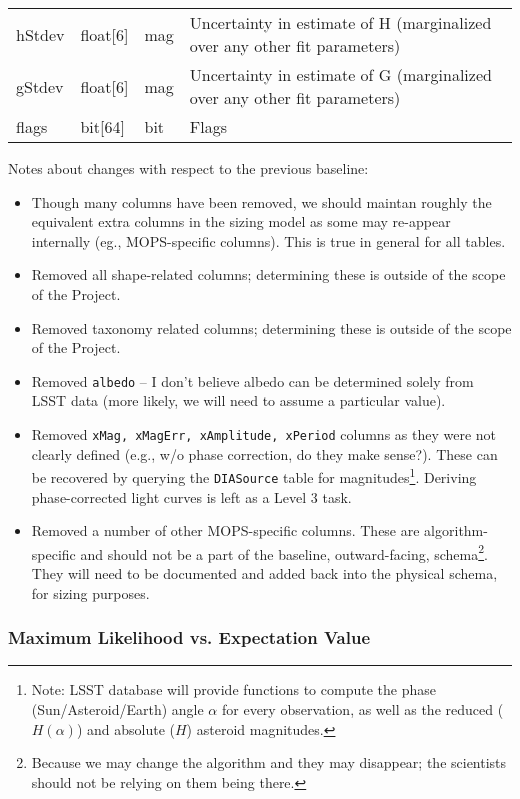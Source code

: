\documentclass[12pt]{article}
\newcommand{\code}[1]{\texttt{#1}}
\newcommand{\DIASource}{\code{DIASource}\xspace}
\begin{document}
\begin{center}
\begin{longtable}{p{3cm}p{2cm}p{2cm}p{5cm}}
hStdev & float[6] & mag & Uncertainty in estimate of H (marginalized over any other fit parameters)\\

gStdev & float[6] & mag & Uncertainty in estimate of G (marginalized over any other fit parameters)\\

flags & bit[64] & bit & Flags \\ \hline

\end{longtable}
\end{center}

Notes about changes with respect to the previous baseline:
\begin{itemize}
\item Though many columns have been removed, we should maintan roughly the equivalent extra columns in the sizing model as some may re-appear internally (eg., MOPS-specific columns). This is true in general for all tables.
\item Removed all shape-related columns; determining these is outside of the scope of the Project.
\item Removed taxonomy related columns; determining these is outside of the scope of the Project.
\item Removed \texttt{albedo} -- I don't believe albedo can be determined solely from LSST data (more likely, we will need to assume a particular value).
\item Removed \texttt{xMag, xMagErr, xAmplitude, xPeriod} columns as they were not clearly defined (e.g., w/o phase correction, do they make sense?). These can be recovered by querying the \DIASource table for magnitudes\footnote{Note: LSST database will provide functions to compute the phase (Sun/Asteroid/Earth) angle $\alpha$ for every observation, as well as the reduced ($H(\alpha)$) and absolute ($H$) asteroid magnitudes.}. Deriving phase-corrected light curves is left as a Level 3 task.
\item Removed a number of other MOPS-specific columns. These are algorithm-specific and should not be a part of the baseline, outward-facing, schema\footnote{Because we may change the algorithm and they may disappear; the scientists should not be relying on them being there.}. They will need to be documented and added back into the physical schema, for sizing purposes.
\end{itemize}

\subsubsection{Maximum Likelihood vs. Expectation Value}
\end{document}
